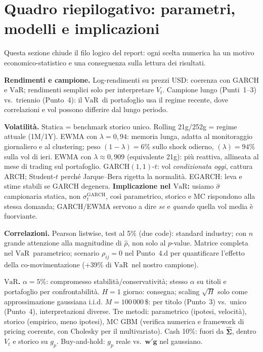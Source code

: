 \documentclass[12pt,a4paper]{article}
\newcommand{\VaR}{\ensuremath{\mathrm{VaR}}}
\newcommand{\USD}{\ensuremath{\,\$}}
\begin{document}
\section{Quadro riepilogativo: parametri, modelli e implicazioni}

Questa sezione chiude il filo logico del report: ogni scelta numerica ha un motivo economico-statistico e una conseguenza sulla lettura dei risultati.

\textbf{Rendimenti e campione.} Log-rendimenti su prezzi USD: coerenza con GARCH e \VaR; rendimenti semplici solo per interpretare $V_t$. Campione lungo (Punti~1--3) vs.\ triennio (Punto~4): il \VaR\ di portafoglio usa il regime recente, dove correlazioni e vol possono differire dal lungo periodo.

\textbf{Volatilità.} Statica = benchmark storico unico. Rolling 21g/252g = regime attuale (1M/1Y). EWMA con $\lambda=0{,}94$: memoria lunga, adatta al monitoraggio giornaliero e al clustering; peso $(1-\lambda)=6\%$ sullo shock odierno, $(\lambda)=94\%$ sulla vol di ieri. EWMA con $\lambda\approx 0{,}909$ (equivalente 21g): più reattiva, allineata al mese di trading sul portafoglio. GARCH$(1,1)$-$t$: vol \emph{condizionata oggi}, cattura ARCH; Student-$t$ perché Jarque--Bera rigetta la normalità. EGARCH: leva e stime stabili se GARCH degenera. \textbf{Implicazione nel \VaR:} usiamo $\hat\sigma$ campionaria statica, non $\sigma_t^{\mathrm{GARCH}}$, così parametrico, storico e MC rispondono alla stessa domanda; GARCH/EWMA servono a dire \emph{se} e \emph{quando} quella vol media è fuorviante.

\textbf{Correlazioni.} Pearson listwise, test al 5\% (due code): standard industry; con $n$ grande attenzione alla magnitudine di $\hat\rho$, non solo al $p$-value. Matrice completa nel \VaR\ parametrico; scenario $\rho_{ij}=0$ nel Punto~4.d per quantificare l'effetto della co-movimentazione (+39\% di \VaR\ nel nostro campione).

\textbf{\VaR.} $\alpha=5\%$: compromesso stabilità/conservatività; stesso $\alpha$ su titoli e portafoglio per confrontabilità. $H=1$ giorno: consegna; scaling $\sqrt{H}$ solo come approssimazione gaussiana i.i.d. $M=100\,000\USD$: per titolo (Punto~3) vs.\ unico (Punto~4), interpretazioni diverse. Tre metodi: parametrico (ipotesi, velocità), storico (empirico, meno ipotesi), MC GBM (verifica numerica e framework di pricing coerente, con Cholesky per il multivariato). Cash 10\%: fuori da $\hat{\boldsymbol\Sigma}$, dentro $V_t$ e storico su $g_p$. Buy-and-hold: $g_p$ reale vs.\ $\mathbf{w}'\mathbf{g}$ nel gaussiano.
\end{document}

